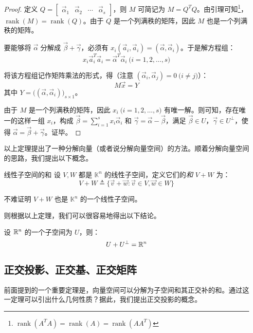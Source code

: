 \begin{proof}
	定义 $Q = \begin{bmatrix} \vec \alpha_1 & \vec \alpha_2 & \cdots & \vec \alpha_s \end{bmatrix}$，则 $M$ 可简记为 $M = Q^T Q$。由引理可知\footnote{$\operatorname{rank}(A^T A) = \operatorname{rank}(A) = \operatorname{rank}(AA^T)$}，$\operatorname{rank}(M) = \operatorname{rank}(Q)$。由于 $Q$ 是一个列满秩的矩阵，因此 $M$ 也是一个列满秩的矩阵。

	\bigskip

	要能够将 $\vec \alpha$ 分解成 $\vec \beta + \vec \gamma$，必须有 $x_i (\vec a_i, \vec a_i) = (\vec \alpha, \vec \alpha_i)$。于是解方程组：
	$$
	x_i \vec a_i^T \vec a_i = \vec \alpha^T \vec \alpha_i \pod{i = 1, 2, \ldots, s}
	$$

	将该方程组记作矩阵乘法的形式，得（注意 $(\vec \alpha_i, \vec \alpha_j) = 0 \pod{i \ne j}$）：
	$$
	M \vec x = Y
	$$
	其中 $Y = \bigl( (\vec \alpha, \vec \alpha_i) \bigr)_{s \times 1}$。

	由于 $M$ 是一个列满秩的矩阵，因此 $x_i \pod{i = 1, 2, \ldots, s}$ 有唯一解。则可知，存在唯一的这样一组 $x_i$，构成 $\vec \beta = \sum\limits_{i = 1}^s x_i \vec \alpha_i$ 和 $\vec \gamma = \vec \alpha - \vec \beta$，满足 $\vec \beta \in U$，$\vec \gamma \in U^\perp$，使得 $\vec \alpha = \vec \beta + \vec \gamma$。证毕。

\end{proof}

以上定理提出了一种分解向量（或者说分解向量空间）的方法。顺着分解向量空间的思路，我们提出以下概念。

\begin{definition}{线性子空间的和}
	设 $V, W$ 都是 $\mathbb K^n$ 的线性子空间，定义它们的\emph{和} $V + W$ 为：
	$$
	V + W \triangleq \{\vec v + \vec w \colon \vec v \in V, \vec w \in W\}
	$$

	不难证明 $V + W$ 也是 $\mathbb K^n$ 的一个线性子空间。
\end{definition}

则根据以上定理，我们可以很容易地得出以下结论。

\begin{theorem}
	设 $\mathbb R^n$ 的一个子空间为 $U$，则：
	$$
	U + U^\perp = \mathbb R^n
	$$
\end{theorem}

\subsection{正交投影、正交基、正交矩阵}

前面提到的一个重要定理是，向量空间可以分解为子空间和其正交补的和。通过这一定理可以引出什么几何性质？据此，我们提出正交投影的概念。

